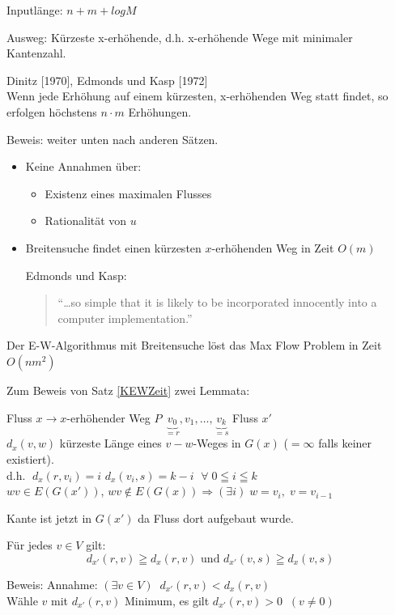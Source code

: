 Inputlänge: $n+m+log M$

Ausweg: Kürzeste x-erhöhende, d.h. x-erhöhende Wege mit minimaler
Kantenzahl.

\begin{satz}\label{KEWZeit}
Dinitz [1970], Edmonds und Kasp [1972]\\
Wenn jede Erhöhung auf einem kürzesten, x-erhöhenden Weg statt findet, so
erfolgen höchstens $n \cdot m$ Erhöhungen.
\end{satz}
Beweis: weiter unten nach anderen Sätzen.

\begin{itemize}
\item Keine Annahmen über:
\begin{itemize}
\item Existenz eines maximalen Flusses
\item Rationalität von $u$
\end{itemize}
\item Breitensuche findet einen kürzesten $x$-erhöhenden Weg in Zeit
$O(m)$

Edmonds und Kasp: \begin{quote} "`\ldots so simple that it is likely to be
incorporated innocently into a computer implementation."'
\end{quote}
\end{itemize}

\begin{korollar}\label{ZeitEWA}
Der E-W-Algorithmus mit Breitensuche löst das Max Flow Problem in Zeit
$O(n m^{2})$
\end{korollar}
Zum Beweis von Satz \ref{KEWZeit} zwei Lemmata:

Fluss $x \rightarrow x$-erhöhender Weg $P$ $\underbrace{v_{0}}_{=r}, v_{1},
\ldots, \underbrace{v_{k}}_{=s}$ Fluss $x'$\\
$d_{x}(v,w)$ kürzeste Länge eines $v-w$-Weges in $G(x)$ ($=\infty$ falls
keiner existiert).\\
d.h. $\; d_{x}(r,v_{i}) = i$ \hspace{3mm} $d_{x}(v_{i}, s) = k -i$ $\;\forall\; 0
\leqq i \leqq k$\\
$w v \in E(G(x'))$, $w v \not \in E (G(x)) \Rightarrow (\exists i )\;  w =
v_{i}, \; v = v_{i-1}$

Kante ist jetzt in $G(x')$ da Fluss dort aufgebaut wurde.

\begin{lemma}\label{dxstrichgr}
Für jedes $v \in V$ gilt:
\[d_{x'}(r,v) \geqq d_{x}(r,v)\mbox{ und }d_{x'}(v,s) \geqq d_{x} (v,s)\]
\end{lemma} 
Beweis: Annahme: $(\exists v \in V)\; \; d_{x'}(r,v) < d_{x}(r,v)$\\
Wähle $v$ mit $d_{x'}(r,v)$ Minimum, es gilt $d_{x'} (r,v) > 0 \; \; (v
\not= 0)$\\

